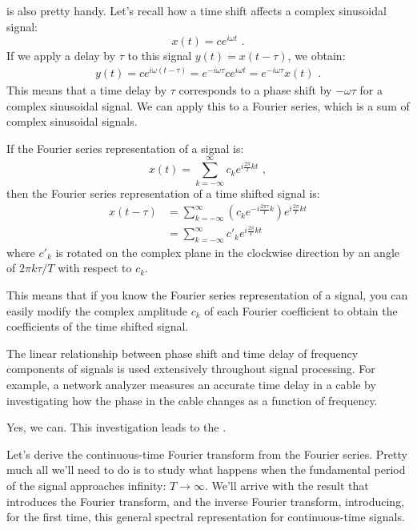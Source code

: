  is also pretty handy.
Let's recall how a time shift affects a complex sinusoidal signal:
\begin{equation}
  x(t) = c e^{i\omega t} \,\,.
\end{equation}
If we apply a delay by $\tau$ to this signal $y(t) = x(t-\tau)$, we obtain:
\begin{align}
  y(t)  = c e^{i\omega (t-\tau)} =  e^{-i\omega \tau} c e^{i\omega t} = e^{-i\omega \tau} x(t) \,\,.
\end{align}
This means that a time delay by $\tau$ corresponds to a phase shift by
$-\omega\tau$ for a complex sinusoidal signal.  We can apply this to a
Fourier series, which is a sum of complex sinusoidal signals.

If the Fourier series representation of a signal is:
\begin{equation}
  x(t) = \sum_{k=-\infty}^{\infty} c_k e^{i\frac{2\pi}{T}kt} \,\,,
\end{equation}
then the Fourier series representation of a time shifted signal is:
\begin{align}
  x(t-\tau) & = \sum_{k=-\infty}^{\infty} \left(c_k e^{-i \frac{2\pi \tau}{T} k}\right) e^{i\frac{2\pi}{T}kt}\label{eq:time_shift_phasor} \\
            & =  \sum_{k=-\infty}^{\infty} c'_k e^{i\frac{2\pi}{T}kt}
\end{align}
where $c'_k$ is rotated on the complex plane in the clockwise
direction by an angle of $2\pi k\tau/T$ with respect to $c_k$.

This means that if you know the Fourier series representation of a
signal, you can easily modify the complex amplitude $c_k$ of each
Fourier coefficient to obtain the coefficients of the time shifted
signal.

The linear relationship between phase shift and time delay of
frequency components of signals is used extensively throughout signal
processing. For example, a network analyzer measures an accurate time
delay in a cable by investigating how the phase in the cable changes
as a function of frequency.

Yes, we can. This investigation leads to the \emph{}.

Let's derive the continuous-time Fourier transform from the Fourier series. Pretty much all we'll need to do is
to study what happens when the fundamental period of the signal approaches infinity: $T\rightarrow \infty$.
We'll arrive with the result that introduces the Fourier transform, and the inverse Fourier transform, 
introducing, for the first time, this general spectral representation for continuous-time signals.

